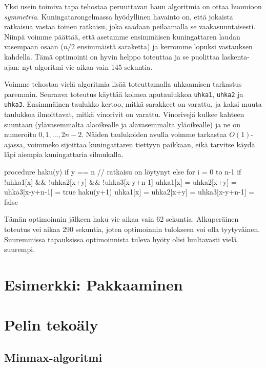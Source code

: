 Yksi usein toimiva tapa tehostaa peruuttavan haun algoritmia
on ottaa huomioon \emph{symmetria}.
Kuningatarongelmassa hyödyllinen havainto on,
että jokaista ratkaisua vastaa toinen ratkaisu,
joka saadaan peilaamalla se vaakasuuntaisesti.
Niinpä voimme päättää, että asetamme ensimmäisen kuningattaren
laudan vasempaan osaan ($n/2$ ensimmäistä saraketta)
ja kerromme lopuksi vastauksen kahdella.
Tämä optimointi on hyvin helppo toteuttaa ja se puolittaa
laskenta-ajan: nyt algoritmi vie aikaa vain 145 sekuntia.

Voimme tehostaa vielä algoritmia lisää toteuttamalla
uhkaamisen tarkastus paremmin.
Seuraava toteutus käyttää kolmea aputaulukkoa
\texttt{uhka1}, \texttt{uhka2} ja \texttt{uhka3}.
Ensimmäinen taulukko kertoo, mitkä sarakkeet on varattu,
ja kaksi muuta taulukkoa ilmoittavat, mitkä vinorivit on varattu.
Vinorivejä kulkee kahteen suuntaan
(ylävasemmalta alaoikealle ja alavasemmalta yläoikealle)
ja ne on numeroitu $0,1,\dots,2n-2$.
Näiden taulukoiden avulla voimme tarkastaa $O(1)$-ajassa,
voimmeko sijoittaa kuningattaren tiettyyn paikkaan,
eikä tarvitse käydä läpi aiempia kuningattaria silmukalla.

\begin{code}
procedure haku(y)
    if y == n
        // ratkaisu on löytynyt
    else
        for i = 0 to n-1
            if !uhka1[x] && !uhka2[x+y] && !uhka3[x-y+n-1]
                uhka1[x] = uhka2[x+y] = uhka3[x-y+n-1] = true
                haku(y+1)
                uhka1[x] = uhka2[x+y] = uhka3[x-y+n-1] = false
\end{code}

Tämän optimoinnin jälkeen haku vie aikaa vain 62 sekuntia.
Alkuperäinen toteutus vei aikaa 290 sekuntia,
joten optimoinnin tulokseen voi olla tyytyväinen.
Suuremmissa tapauksissa optimoinnista tuleva hyöty olisi
luultavasti vielä suurempi.

\section{Esimerkki: Pakkaaminen}

\section{Pelin tekoäly}

\subsection{Minmax-algoritmi}

